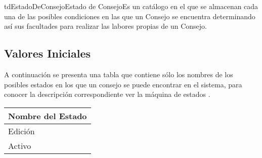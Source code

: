 	\begin{TipoDeDato}{tdEstadoDeConsejo}{Estado de Consejo}{Es un catálogo en el que se almacenan cada una de las posibles condiciones en las que un Consejo se encuentra determinando así sus facultades para realizar las labores propias de un Consejo.}
	 \begin{tdAtributos}
	 \end{tdAtributos}
	
	 \subsection{Valores Iniciales}

	A continuación se presenta una tabla que contiene sólo los nombres de los posibles estados en los que un consejo se puede encontrar en el sistema, para conocer la descripción correspondiente ver la máquina de estados .\cdtEmpty
	
	\begin{longtable}{| p{}|}
	 			\rowcolor{colorPrincipal}
	 			\bf \color{white} Nombre del Estado\\
	 			\hline
	 				Edición \\
	 				\hline
	 				Activo \\
	 	\hline
	\end{longtable}
	\end{TipoDeDato}
	
